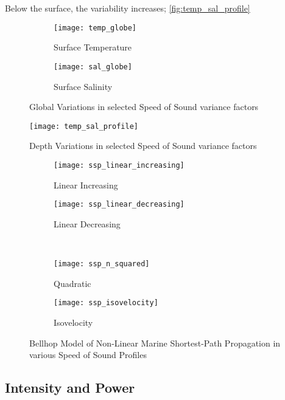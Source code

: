 Below the surface, the variability increases; \autoref{fig:temp_sal_profile}

\begin{figure}
	\centering
	\begin{subfigure}[t]{0.8\textwidth}
		\centering
		\texttt{[image: temp\_globe]}
		\caption{Surface Temperature}
		\label{fig:temp_globe}
	\end{subfigure}
	\begin{subfigure}[t]{0.8\textwidth}
		\centering
		\texttt{[image: sal\_globe]}
		\caption{Surface Salinity}
		\label{fig:sal_globe}
	\end{subfigure}
	\caption{Global Variations in selected Speed of Sound variance factors}
	\label{fig:globes}
\end{figure}


\begin{figure}
	\centering
	\texttt{[image: temp\_sal\_profile]}
	\caption{Depth Variations in selected Speed of Sound variance factors}
	\label{fig:temp_sal_profile}
\end{figure}


\begin{figure}
	\begin{subfigure}[t]{0.45\textwidth}
		\centering
		\texttt{[image: ssp\_linear\_increasing]}
		\caption{Linear Increasing}
		\label{fig:ssp_linear_increasing}
	\end{subfigure}
	\begin{subfigure}[t]{0.45\textwidth}
		\centering
		\texttt{[image: ssp\_linear\_decreasing]}
		\caption{Linear Decreasing}
		\label{fig:ssp_linear_decreasing}
	\end{subfigure}\\
	\begin{subfigure}[t]{0.45\textwidth}
		\centering
		\texttt{[image: ssp\_n\_squared]}
		\caption{Quadratic}
		\label{fig:ssp_n_squared}
	\end{subfigure}
	\begin{subfigure}[t]{0.45\textwidth}
		\centering
		\texttt{[image: ssp\_isovelocity]}
		\caption{Isovelocity}
		\label{fig:ssp_isovelocity}
	\end{subfigure}
	\caption{Bellhop Model of Non-Linear Marine Shortest-Path Propagation in various Speed of Sound Profiles}
	\label{fig:ssps}
\end{figure}

\subsection{Intensity and Power} 

